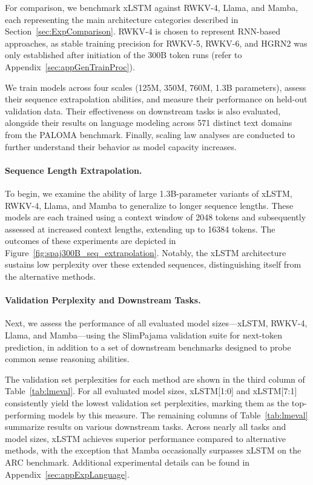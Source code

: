 For comparison, we benchmark xLSTM against RWKV-4, Llama, and Mamba, each representing the main architecture categories described in Section~\ref{sec:ExpComparison}. RWKV-4 is chosen to represent RNN-based approaches, as stable training precision for RWKV-5, RWKV-6, and HGRN2 was only established after initiation of the 300B token runs (refer to Appendix~\ref{sec:appGenTrainProc}).

We train models across four scales (125M, 350M, 760M, 1.3B parameters), assess their sequence extrapolation abilities, and measure their performance on held-out validation data. Their effectiveness on downstream tasks is also evaluated, alongside their results on language modeling across 571 distinct text domains from the PALOMA benchmark. Finally, scaling law analyses are conducted to further understand their behavior as model capacity increases.

\paragraph{Sequence Length Extrapolation.}
\label{sec:spaj300B_ctx_extrapolation}
To begin, we examine the ability of large 1.3B-parameter variants of xLSTM, RWKV-4, Llama, and Mamba to generalize to longer sequence lengths. These models are each trained using a context window of 2048 tokens and subsequently assessed at increased context lengths, extending up to 16384 tokens. The outcomes of these experiments are depicted in Figure~\ref{fig:spaj300B_seq_extrapolation}. Notably, the xLSTM architecture sustains low perplexity over these extended sequences, distinguishing itself from the alternative methods.

\paragraph{Validation Perplexity and Downstream Tasks.}
\label{sec:spaj_downstream_eval}
Next, we assess the performance of all evaluated model sizes—xLSTM, RWKV-4, Llama, and Mamba—using the SlimPajama validation suite for next-token prediction, in addition to a set of downstream benchmarks designed to probe common sense reasoning abilities.

The validation set perplexities for each method are shown in the third column of Table~\ref{tab:lmeval}. For all evaluated model sizes, xLSTM[1:0] and xLSTM[7:1] consistently yield the lowest validation set perplexities, marking them as the top-performing models by this measure. The remaining columns of Table~\ref{tab:lmeval} summarize results on various downstream tasks. Across nearly all tasks and model sizes, xLSTM achieves superior performance compared to alternative methods, with the exception that Mamba occasionally surpasses xLSTM on the ARC benchmark. Additional experimental details can be found in Appendix~\ref{sec:appExpLanguage}.

